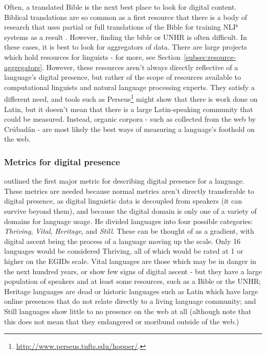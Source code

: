Often, a translated Bible is the next best place to look for digital content. Biblical translations are so common as a first resource that there is a body of research that uses partial or full translations of the Bible for training NLP systems as a result \citep{chew2006evaluation, agic2015if}. However, finding the bible or UNHR is often difficult. In these cases, it is best to look for aggregators of data. There are large projects which hold resources for linguists - for more, see Section~\ref{subsec:resource-aggregators}. However, these resources aren't always directly reflective of a language's digital presence, but rather of the scope of resources available to computational linguists and natural language processing experts. They satisfy a different need, and tools such as Perseus\footnote{\href{http://www.perseus.tufts.edu/hopper/}{http://www.perseus.tufts.edu/hopper/}. } might show that there is work done on Latin, but it doesn't mean that there is a large Latin-speaking community that could be measured. Instead, organic corpora - such as collected from the web by Cr\'ubad\'an - are most likely the best ways of measuring a language's foothold on the web.

\subsubsection{Metrics for digital presence}

\citet{kornai2013digital} outlined the first major metric for describing digital presence for a language. These metrics are needed because normal metrics aren't directly transferable to digital presence, as digital linguistic data is decoupled from speakers (it can survive beyond them), and because the digital domain is only one of a variety of domains for language usage. He divided languages into four possible categories: {\it Thriving}, {\it Vital}, {\it Heritage}, and {\it Still}. These can be thought of as a gradient, with digital ascent being the process of a language moving up the scale. Only 16 languages would be considered Thriving, all of which would be rated at 1 or higher on the EGIDs scale. Vital languages are those which may be in danger in the next hundred years, or show few signs of digital ascent - but they have a large population of speakers and at least some resources, such as a Bible or the UNHR; Heritage languages are dead or historic languages such as Latin which have large online presences that do not relate directly to a living language community; and Still languages show little to no presence on the web at all (although note that this does not mean that they endangered or moribund outside of the web.)

